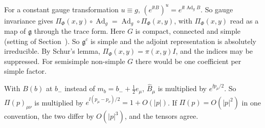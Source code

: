 \begin{detail}\label{d11a:B1}
\begin{step}
For a constant gauge transformation $u\equiv g$, $(e^{\ii tB})^u=e^{\ii t\operatorname{Ad}_gB}$. So gauge invariance gives $\Pi_\Phi(x,y)\circ\operatorname{Ad}_g=\operatorname{Ad}_g\circ\Pi_\Phi(x,y)$, with $\Pi_\Phi(x,y)$ read as a map of $\mathfrak g$ through the trace form. Here $G$ is compact, connected and simple (setting of Section~). So $\mathfrak g^c$ is simple and the adjoint representation is absolutely irreducible. By Schur's lemma, $\Pi_\Phi(x,y)=\pi(x,y)I$, and the indices may be suppressed. For semisimple non-simple $G$ there would be one coefficient per simple factor.
\end{step}
\begin{step}
With $B(b)$ at $b_-$ instead of $m_b=b_-+\frac12e_\mu$, $\hat B_\mu$ is multiplied by $e^{\ii p_\mu/2}$. So $\Pi(p)_{\mu\nu}$ is multiplied by $e^{\ii(p_\mu-p_\nu)/2}=1+O(|p|)$. If $\Pi(p)=O(|p|^2)$ in one convention, the two differ by $O(|p|^3)$, and the tensors agree.
\end{step}
\end{detail}

